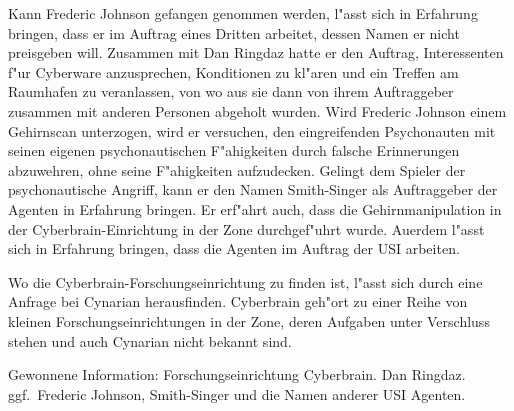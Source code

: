 Kann Frederic Johnson gefangen genommen werden, l"asst sich in Erfahrung bringen, dass er im Auftrag eines Dritten arbeitet, dessen Namen er nicht preisgeben will. Zusammen mit Dan Ringdaz hatte er den Auftrag, Interessenten f"ur Cyberware anzusprechen, Konditionen zu kl"aren und ein Treffen am Raumhafen zu veranlassen, von wo aus sie dann von ihrem Auftraggeber zusammen mit anderen Personen abgeholt wurden. Wird Frederic Johnson einem Gehirnscan unterzogen, wird er versuchen, den eingreifenden Psychonauten mit seinen eigenen psychonautischen F"ahigkeiten durch falsche Erinnerungen abzuwehren, ohne seine F"ahigkeiten aufzudecken. Gelingt dem Spieler der psychonautische Angriff, kann er den Namen Smith-Singer als Auftraggeber der Agenten in Erfahrung bringen. Er erf"ahrt auch, dass die Gehirnmanipulation in der Cyberbrain-Einrichtung in der Zone durchgef"uhrt wurde. Au\3erdem l"asst sich in Erfahrung bringen, dass die Agenten im Auftrag der USI arbeiten.

Wo die Cyberbrain-Forschungseinrichtung zu finden ist, l"asst sich durch eine Anfrage bei Cynarian herausfinden. Cyberbrain geh"ort zu einer Reihe von kleinen Forschungseinrichtungen in der Zone, deren Aufgaben unter Verschluss stehen und auch Cynarian nicht bekannt sind.

\begin{remarks}
	Gewonnene Information: Forschungseinrichtung Cyberbrain. Dan Ringdaz. ggf.~Frederic Johnson, Smith-Singer und die Namen anderer USI Agenten.
\end{remarks}
